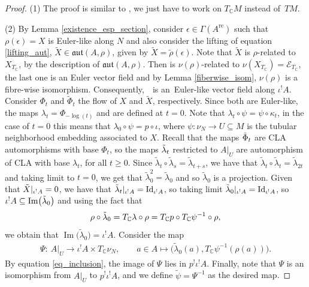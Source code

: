 \documentclass[pdftex]{sigma}
\numberwithin{equation}{section}
\newcommand{\C}{{\mathbb{C}}}
\newcommand{\aut}{\mathfrak{aut}}
\DeclareMathOperator{\im}{Im}
\DeclareMathOperator{\real}{re}
\begin{document}
\begin{proof}
(1) The proof is similar to \cite[Theorem 3.13]{bursztyn2019splitting}, we just have to work on $T_{\C}M$ instead of~$TM$.

   (2) By Lemma \ref{existence_esp_section}, consider $\epsilon\in \Gamma(A^{\real})$ such that $\rho(\epsilon)=X$ is Euler-like along $N$ and also consider the lifting of equation \eqref{lifting_aut}, $\widetilde{X}\in \aut(A, \rho)$, given by $\widetilde{X}=\widetilde{\rho}(\epsilon)$.
  Note that $\widetilde{X}$ is $\rho$-related to $X_{T_{\C}}$, by the description of $\aut(A,\rho)$.
   Then  is $\nu(\rho)$-related to $\nu(X_{T_{\C}})=\mathcal{E}_{T_{\C}}$, the last one is an Euler vector field and by Lemma \ref{fiberwise_isom}, $\nu(\rho)$ is a fibre-wise isomorphism. Consequently,~~is an~Euler-like vector field along $\iota^! A$.
   Consider $\Phi_t$ and $\widetilde{\Phi}_t$ the flow of $X$ and $\widetilde{X}$, respectively. Since both are Euler-like, the maps $\lambda_t=\Phi_{-\log(t)}$ and  are defined at $t=0$. Note that $ \lambda_t\circ \psi=\psi\circ \kappa_t$, in the case of $t=0$ this means that $\lambda_0\circ\psi=p\circ \iota$, where $\psi\colon \nu_N\to U\subseteq M$ is the tubular neighborhood embedding associated to $X$. Recall that the maps $\Tilde{\Phi}_t$ are CLA automorphisms with base $\Phi_t$, so the maps $\Tilde{\lambda}_t$ restricted to $A|_U$ are automorphism of CLA with base $\lambda_t$, for all $t\geq 0$.
   Since $\widetilde{\lambda}_t\circ\widetilde{\lambda}_s=\widetilde{\lambda}_{t+s}$, we have that $\widetilde{\lambda}_t\circ\widetilde{\lambda}_t=\widetilde{\lambda}_{2t}$ and taking limit to $t=0$, we get that $\widetilde{\lambda}^2_0=\widetilde{\lambda}_0$ and so $\widetilde{\lambda}_0$ is a projection. Given that $\Tilde{X}|_{\iota^! A}=0$, we have that $\Tilde{\lambda}_t|_{\iota^! A}={\rm Id}_{\iota^! A}$, so taking limit $\Tilde{\lambda}_0|_{\iota^! A}={\rm Id}_{\iota^! A}$, so $\iota^! A\subseteq \im\bigl(\Tilde{\lambda}_0\bigr)$ and using the fact that
  \begin{equation}\label{eq_inclusion}
    \rho\circ \Tilde{\lambda}_0=T_{\C}\lambda\circ \rho=T_{\C}p\circ T_{\C}\psi^{-1}\circ\rho,
  \end{equation}
  we obtain that $\im\bigl(\widetilde{\lambda}_0\bigr)=\iota^! A$. Consider the map
  \begin{align*} \Psi\colon \ A|_U \to \iota^! A\times T_{\C}\nu_N, \qquad
   a\in A \mapsto \bigl(\widetilde{\lambda}_0(a), T_{\C}\psi^{-1}(\rho(a))\bigr).
   \end{align*}
By equation \eqref{eq_inclusion}, the image of $\Psi$ lies in $p^!\iota^! A$. Finally, note that $\Psi$ is an isomorphism from $A|_U$ to $p^!\iota^! A$, and we define $\widetilde{\psi}=\Psi^{-1}$ as the desired map.
\end{proof}
\end{document}

